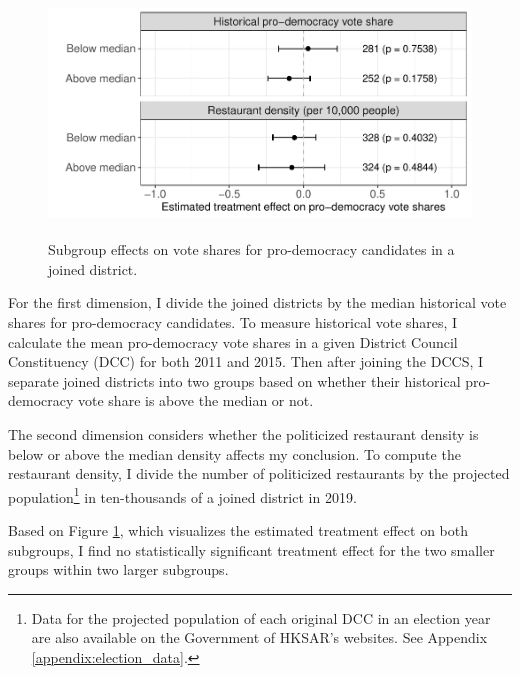 \documentclass[letterpaper, 12pt]{article}
\begin{document}
\vspace{6pt}
\begin{figure}[!h]
    \centering
    \includegraphics[width=13cm, height=6.5cm]{Visuals/hte.pdf}
    \caption{Subgroup effects on vote shares for pro-democracy candidates in a joined district.}
    \label{fig:hte}
\end{figure}

For the first dimension, I divide the joined districts by the median historical vote shares for pro-democracy candidates. To measure historical vote shares, I calculate the mean pro-democracy vote shares in a given District Council Constituency (DCC) for both 2011 and 2015. Then after joining the DCCS, I separate joined districts into two groups based on whether their historical pro-democracy vote share is above the median or not. 

The second dimension considers whether the politicized restaurant density is below or above the median density affects my conclusion. To compute the restaurant density, I divide the number of politicized restaurants by the projected population\footnote{Data for the projected population of each original DCC in an election year are also available on the Government of HKSAR's websites. See Appendix \ref{appendix:election_data}.} in ten-thousands of a joined district in 2019. 

Based on Figure \ref{fig:hte}, which visualizes the estimated treatment effect on both subgroups, I find no statistically significant treatment effect for the two smaller groups within two larger subgroups.  
\end{document}
